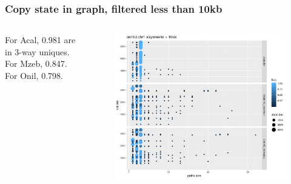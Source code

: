 \documentclass[aspectratio=169]{beamer}
\begin{document}
\begin{frame}
  \frametitle{Copy state in graph, filtered less than 10kb}
  \begin{columns}[c] %
    For Acal, 0.981 are in 3-way uniques.
    For Mzeb, 0.847.
    For Onil, 0.798.
    \begin{figure}
      \includegraphics[scale=0.42,center]{cichlid_chr1_fpal10k_busco_multicov_len_vs_path_size.png}
    \end{figure}
  \end{columns}
\end{frame}
\end{document}
